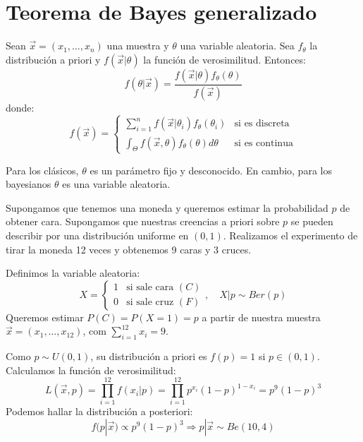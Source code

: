 \section{Teorema de Bayes generalizado}
\begin{theorem}
    Sean $\vec{x} = (x_1, \dots, x_n)$ una muestra y $\theta$ una variable aleatoria.
    Sea $f_\theta$ la distribución a priori y $f(\vec{x}|\theta)$ la función de verosimilitud.
    Entonces:
    $$f(\theta|\vec{x}) = \frac{f(\vec{x}|\theta)f_\theta(\theta)}{f(\vec{x})}$$
    donde:
    $$f(\vec{x}) = \begin{cases}
            \sum_{i=1}^n f(\vec{x}|\theta_i)f_\theta(\theta_i)    & \text{si es discreta} \\
            \int_\Theta f(\vec{x}, \theta)f_\theta(\theta)d\theta & \text{si es continua}
        \end{cases}$$
\end{theorem}

\begin{remark}
    Para los clásicos, $\theta$ es un parámetro fijo y desconocido.
    En cambio, para los bayesianos $\theta$ es una variable aleatoria.
\end{remark}

\begin{example}
    Supongamos que tenemos una moneda y queremos estimar la probabilidad $p$ de obtener cara.
    Supongamos que nuestras creencias a priori sobre $p$ se pueden describir por una distribución uniforme en $(0, 1)$.
    Realizamos el experimento de tirar la moneda 12 veces y obtenemos 9 caras y 3 cruces.

    Definimos la variable aleatoria:
    $$X = \begin{cases}
            1 & \text{si sale cara } (C) \\
            0 & \text{si sale cruz } (F)
        \end{cases}, \quad X|p \sim Ber(p)$$
    Queremos estimar $P(C) = P(X = 1) = p$ a partir de nuestra muestra $\vec{x} = (x_1, \dots, x_{12})$, com $\sum_{i=1}^{12} x_i = 9$.

    Como $p \sim U(0, 1)$, su distribución a priori es $f(p) = 1$ si $p \in (0, 1)$.
    Calculamos la función de verosimilitud:
    $$L(\vec{x}, p) = \prod_{i=1}^{12} f(x_i|p) = \prod_{i=1}^{12} p^{x_i}(1-p)^{1-x_i} = p^9(1-p)^3$$
    Podemos hallar la distribución a posteriori:
    $$f(p|\vec{x}) \propto p^9(1-p)^3 \Rightarrow p|\vec{x} \sim Be(10, 4)$$
\end{example}


